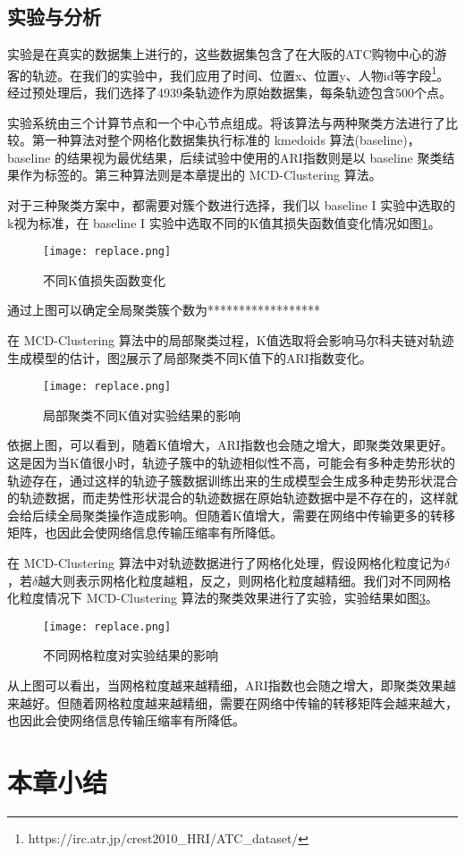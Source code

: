 \subsection{实验与分析}
实验是在真实的数据集上进行的，这些数据集包含了在大阪的ATC购物中心的游客的轨迹。在我们的实验中，我们应用了时间、位置x、位置y、人物id等字段\footnote[1]{https://irc.atr.jp/crest2010_HRI/ATC_dataset/}。经过预处理后，我们选择了4939条轨迹作为原始数据集，每条轨迹包含500个点。

实验系统由三个计算节点和一个中心节点组成。将该算法与两种聚类方法进行了比较。第一种算法对整个网格化数据集执行标准的 kmedoids 算法(baseline)， baseline 的结果视为最优结果，后续试验中使用的ARI指数则是以 baseline 聚类结果作为标签的。第三种算法则是本章提出的 MCD-Clustering 算法。

对于三种聚类方案中，都需要对簇个数进行选择，我们以 baseline I 实验中选取的k视为标准，在 baseline I 实验中选取不同的K值其损失函数值变化情况如图\ref{differentK}。
\begin{figure}[h]
	\texttt{[image: replace.png]}
	\caption{不同K值损失函数变化}
	\label{differentK}
\end{figure}

通过上图可以确定全局聚类簇个数为******************

在 MCD-Clustering 算法中的局部聚类过程，K值选取将会影响马尔科夫链对轨迹生成模型的估计，图\ref{differentKJB}展示了局部聚类不同K值下的ARI指数变化。
\begin{figure}[h]
	\texttt{[image: replace.png]}
	\caption{局部聚类不同K值对实验结果的影响}
	\label{differentKJB}
\end{figure}

依据上图，可以看到，随着K值增大，ARI指数也会随之增大，即聚类效果更好。这是因为当K值很小时，轨迹子簇中的轨迹相似性不高，可能会有多种走势形状的轨迹存在，通过这样的轨迹子簇数据训练出来的生成模型会生成多种走势形状混合的轨迹数据，而走势性形状混合的轨迹数据在原始轨迹数据中是不存在的，这样就会给后续全局聚类操作造成影响。但随着K值增大，需要在网络中传输更多的转移矩阵，也因此会使网络信息传输压缩率有所降低。

在 MCD-Clustering 算法中对轨迹数据进行了网格化处理，假设网格化粒度记为$\delta$，若$\delta$越大则表示网格化粒度越粗，反之，则网格化粒度越精细。我们对不同网格化粒度情况下 MCD-Clustering 算法的聚类效果进行了实验，实验结果如图\ref{differentDELTA}。
\begin{figure}[h]
	\texttt{[image: replace.png]}
	\caption{不同网格粒度对实验结果的影响}
	\label{differentDELTA}
\end{figure}

从上图可以看出，当网格粒度越来越精细，ARI指数也会随之增大，即聚类效果越来越好。但随着网格粒度越来越精细，需要在网络中传输的转移矩阵会越来越大，也因此会使网络信息传输压缩率有所降低。


\section{本章小结}

